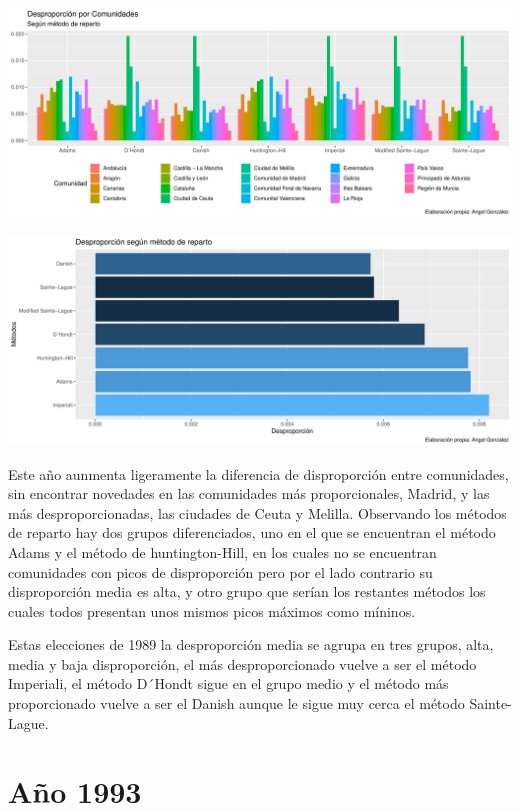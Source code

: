 \documentclass[12pt,a4paper,]{book}
\numberwithin{dummy}{section}
\theoremstyle{ocrenumbox}
\theoremstyle{blacknumex}
\theoremstyle{blacknumbox}
\theoremstyle{ocrenum}
\theoremstyle{ocrenum}
\begin{document}
\begin{center}\includegraphics[width=0.95\linewidth]{figurasR/unnamed-chunk-96-1} \end{center}

\begin{center}\includegraphics[width=0.95\linewidth]{figurasR/unnamed-chunk-96-2} \end{center}

Este año aunmenta ligeramente la diferencia de disproporción entre
comunidades, sin encontrar novedades en las comunidades más
proporcionales, Madrid, y las más desproporcionadas, las ciudades de
Ceuta y Melilla. Observando los métodos de reparto hay dos grupos
diferenciados, uno en el que se encuentran el método Adams y el método
de huntington-Hill, en los cuales no se encuentran comunidades con picos
de disproporción pero por el lado contrario su disproporción media es
alta, y otro grupo que serían los restantes métodos los cuales todos
presentan unos mismos picos máximos como míninos.

Estas elecciones de 1989 la desproporción media se agrupa en tres
grupos, alta, media y baja disproporción, el más desproporcionado vuelve
a ser el método Imperiali, el método D´Hondt sigue en el grupo medio y
el método más proporcionado vuelve a ser el Danish aunque le sigue muy
cerca el método Sainte-Lague.

\hypertarget{auxf1o-1993}{%
\section{Año 1993}\label{auxf1o-1993}}
\end{document}
